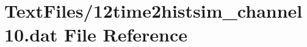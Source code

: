 \hypertarget{12time2histsim__channel10_8dat}{}\section{Text\+Files/12time2histsim\+\_\+channel10.dat File Reference}
\label{12time2histsim__channel10_8dat}
